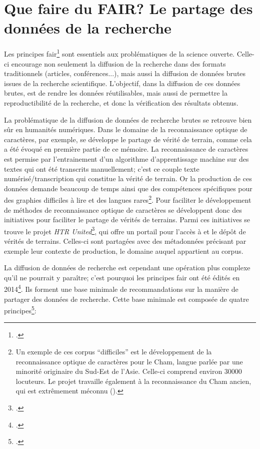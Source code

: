 \section{Que faire du FAIR? Le partage des données de la recherche}
Les principes \gls{fair}\footcite{boeckhout_fair_2018} sont essentiels aux problématiques de la science ouverte. Celle-ci encourage non seulement la diffusion de la recherche dans des formats traditionnels (articles, conférences...), mais aussi la diffusion de données brutes issues de la recherche scientifique. L'objectif, dans la diffusion de ces données brutes, est de rendre les données réutilisables, mais aussi de permettre la reproductibilité de la recherche, et donc la vérification des résultats obtenus. 

La problématique de la diffusion de données de recherche brutes se retrouve bien sûr en humanités numériques. Dans le domaine de la reconnaissance optique de caractères, par exemple, se développe le partage de vérité de terrain, comme cela a été évoqué en première partie de ce mémoire. La reconnaissance de caractères est permise par l'entrainement d'un algorithme d'apprentissage machine sur des textes qui ont été transcrits manuellement; c'est ce couple texte numérisé/transcription qui constitue la vérité de terrain. Or la production de ces données demande beaucoup de temps ainsi que des compétences spécifiques pour des graphies difficiles à lire et des langues rares\footnote{Un exemple de ces corpus \enquote{difficiles} est le développement de la reconnaissance optique de caractères pour le Cham, langue parlée par une minorité originaire du Sud-Est de l'Asie. Celle-ci comprend environ 30000 locuteurs. Le projet travaille également à la reconnaissance du Cham ancien, qui est extrêmement méconnu (\cite{schweyer_analyse_2022}).}. Pour faciliter le développement de méthodes de reconnaissance optique de caractères se développent donc des initiatives pour faciliter le partage de vérités de terrains. Parmi ces initiatives se trouve le projet \textit{HTR United}\footcite{chague_sharing_2022}, qui offre un portail pour l'accès à et le dépôt de vérités de terrains. Celles-ci sont partagées avec des métadonnées précisant par exemple leur contexte de production, le domaine auquel appartient au corpus.

La diffusion de données de recherche est cependant une opération plus complexe qu'il ne pourrait y paraître; c'est pourquoi les principes \gls{fair} ont été édités en 2014\footcite[p. 931]{boeckhout_fair_2018}. Ils forment une base minimale de recommandations sur la manière de partager des données de recherche. Cette base minimale est composée de quatre principes\footcite[p. 932-933]{boeckhout_fair_2018}: 

